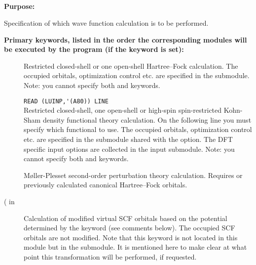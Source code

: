 \pagebreak[3]
\subsection{\label{ref-geninp}}

{\bf Purpose:}

Specification of which wave function calculation is to be performed.

{\bf Primary keywords, listed in the order the corresponding modules
 will be executed by the program (if the keyword is set): }

\begin{description}

\item[]
  Restricted closed-shell or one open-shell 
  Hartree--Fock calculation.
  The occupied orbitals, optimization control etc. are specified in the
   submodule.
  Note: you cannot specify both  and  keywords.

\item[]
  \verb"READ (LUINP,'(A80)) LINE" \\ Restricted closed-shell, one
  open-shell or high-spin spin-restricted Kohn-Sham density functional
  theory
  calculation.  On the following line you must specify which
  functional to use.  The occupied orbitals, optimization control
  etc. are specified in the  submodule shared with
  the  option.  The DFT specific input options are
  collected in the  input submodule.  Note: you
  cannot specify both  and  keywords.

\item[]
  M{\o}ller-Plesset second-order perturbation theory calculation.
  Requires  or previously calculated canonical Hartree--Fock orbitals.

\item[( in ]
  Calculation of modified virtual SCF orbitals based on the
  potential determined by the keyword (see comments below).
  The occupied SCF orbitals are not modified.
  Note that this keyword is not located in this module but in the
   submodule. It is mentioned here to make clear
  at what point this transformation will be performed, if requested.


\end{description}
